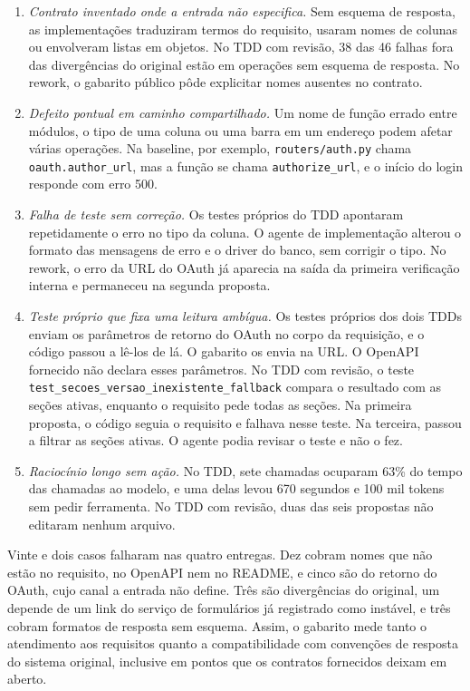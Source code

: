 \documentclass[a4paper,12pt,twoside,english,brazilian]{book}
\begin{document}
\begin{enumerate}
  \item \emph{Contrato inventado onde a entrada não especifica.} Sem esquema de
    resposta, as implementações traduziram termos do requisito, usaram nomes de colunas ou
    envolveram listas em objetos. No TDD com revisão, 38 das 46 falhas fora das
    divergências do original estão em operações sem esquema de resposta. No
    rework, o gabarito público pôde explicitar nomes ausentes no contrato.
  \item \emph{Defeito pontual em caminho compartilhado.} Um nome de função
    errado entre módulos, o tipo de uma coluna ou uma barra em um endereço
    podem afetar várias operações. Na baseline, por exemplo, \texttt{routers/auth.py} chama
    \texttt{oauth.author\_url}, mas a função se chama
    \texttt{authorize\_url}, e o início do login responde com erro 500.
  \item \emph{Falha de teste sem correção.} Os testes próprios do TDD
    apontaram repetidamente o erro no tipo da coluna. O agente de implementação
    alterou o formato das mensagens de erro e o driver do banco, sem corrigir
    o tipo. No rework, o erro da URL do OAuth já aparecia na
    saída da primeira verificação interna e permaneceu na segunda proposta.
  \item \emph{Teste próprio que fixa uma leitura ambígua.} Os testes próprios
    dos dois TDDs enviam os parâmetros de retorno do OAuth no corpo da
    requisição, e o código passou a lê-los de lá. O gabarito os envia na URL.
    O OpenAPI fornecido não declara esses parâmetros. No TDD com revisão, o
    teste \texttt{test\_secoes\_versao\_inexistente\_fallback} compara o
    resultado com as seções ativas, enquanto o requisito pede todas as seções.
    Na primeira proposta, o código seguia o requisito e falhava nesse teste.
    Na terceira, passou a filtrar as seções ativas. O agente podia revisar o
    teste e não o fez.
  \item \emph{Raciocínio longo sem ação.} No TDD, sete chamadas ocuparam 63\%
    do tempo das chamadas ao modelo, e uma delas levou 670 segundos e 100 mil
    tokens sem pedir ferramenta. No TDD com revisão, duas das seis propostas
    não editaram nenhum arquivo.
\end{enumerate}

Vinte e dois casos falharam nas quatro
entregas. Dez cobram nomes que não estão no requisito, no OpenAPI nem no
README, e cinco são do retorno do OAuth, cujo canal a entrada não define.
Três são divergências do original, um depende de um link do serviço de
formulários já registrado como instável, e três cobram formatos de resposta
sem esquema. Assim, o gabarito mede tanto o atendimento aos requisitos
quanto a compatibilidade com convenções de resposta do sistema original,
inclusive em pontos que os contratos fornecidos deixam em aberto.
\end{document}
